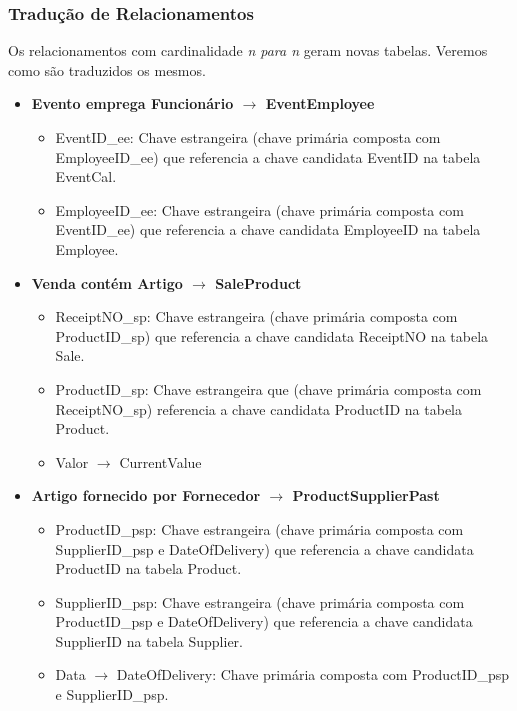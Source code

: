 \documentclass[a4paper,12pt]{scrreprt}
\begin{document}
\subsubsection{Tradução de Relacionamentos}
    Os relacionamentos com cardinalidade \textit{n para n} geram novas tabelas. Veremos como são traduzidos os mesmos.
    \begin{itemize}
        \item{\textbf{Evento emprega Funcionário $\rightarrow$ EventEmployee}}
            \begin{itemize}
                \item{EventID\_ee:} Chave estrangeira (chave primária composta com EmployeeID\_ee) que referencia a chave candidata EventID na tabela EventCal.
                \item{EmployeeID\_ee:} Chave estrangeira (chave primária composta com EventID\_ee) que referencia a chave candidata EmployeeID na tabela Employee.
            \end{itemize}
        \item{\textbf{Venda contém Artigo $\rightarrow$ SaleProduct}}
            \begin{itemize}
                \item{ReceiptNO\_sp:} Chave estrangeira (chave primária composta com ProductID\_sp) 
                que referencia a chave candidata ReceiptNO na tabela Sale.
                \item{ProductID\_sp:} Chave estrangeira que (chave primária composta com ReceiptNO\_sp)
                referencia a chave candidata ProductID na tabela Product.
                \item{Valor $\rightarrow$ CurrentValue}
            \end{itemize}
        \item{\textbf{Artigo fornecido por Fornecedor $\rightarrow$ ProductSupplierPast}}
            \begin{itemize}
                \item{ProductID\_psp:} Chave estrangeira (chave primária composta com SupplierID\_psp e DateOfDelivery)
                que referencia a chave candidata ProductID na tabela Product.
                \item{SupplierID\_psp:} Chave estrangeira (chave primária composta com ProductID\_psp e DateOfDelivery)
                que referencia a chave candidata SupplierID na tabela Supplier.
                \item{Data $\rightarrow$ DateOfDelivery:} Chave primária composta com ProductID\_psp e SupplierID\_psp. 

\end{itemize}
\end{itemize}
\end{document}
